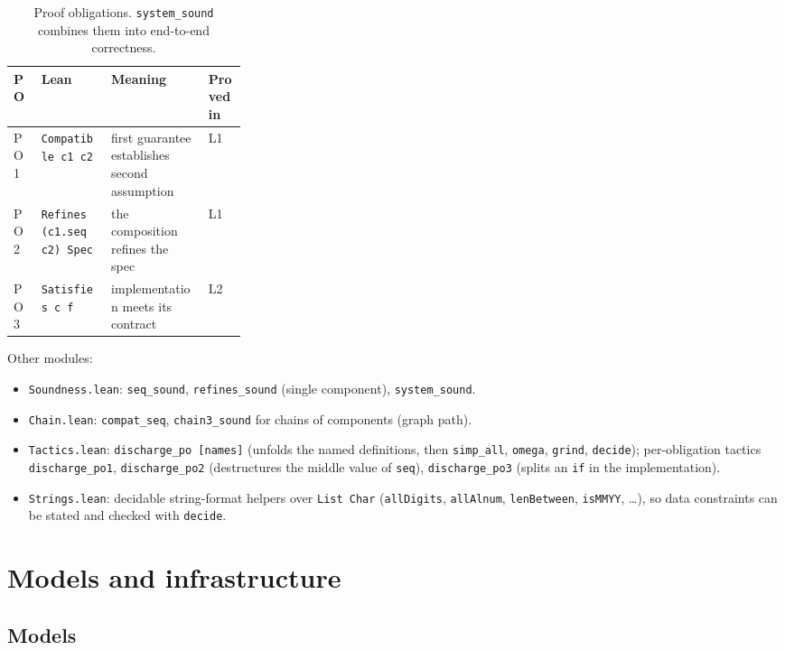 \documentclass[11pt,a4paper]{article}
\newcommand{\code}[1]{\texttt{#1}}
\newcommand{\file}[1]{\texttt{#1}}
\begin{document}
\begin{table}[h]
\centering
\small
\begin{tabularx}{\linewidth}{l >{\raggedright\arraybackslash}p{0.3\linewidth} L l}
\toprule
PO & Lean & Meaning & Proved in \\
\midrule
PO1 & \code{Compatible c1 c2} & first guarantee establishes second assumption & L1 \\
PO2 & \code{Refines (c1.seq c2) Spec} & the composition refines the spec & L1 \\
PO3 & \code{Satisfies c f} & implementation meets its contract & L2 \\
\bottomrule
\end{tabularx}
\caption{Proof obligations. \code{system\_sound} combines them into end-to-end correctness.}
\end{table}

Other modules:
\begin{itemize}
  \item \file{Soundness.lean}: \code{seq\_sound}, \code{refines\_sound} (single component),
        \code{system\_sound}.
  \item \file{Chain.lean}: \code{compat\_seq}, \code{chain3\_sound} for chains of components (graph path).
  \item \file{Tactics.lean}: \code{discharge\_po [names]} (unfolds the named definitions, then
        \code{simp\_all}, \code{omega}, \code{grind}, \code{decide}); per-obligation tactics
        \code{discharge\_po1}, \code{discharge\_po2} (destructures the middle value of \code{seq}),
        \code{discharge\_po3} (splits an \code{if} in the implementation).
  \item \file{Strings.lean}: decidable string-format helpers over \code{List Char}
        (\code{allDigits}, \code{allAlnum}, \code{lenBetween}, \code{isMMYY}, \ldots), so data
        constraints can be stated and checked with \code{decide}.
\end{itemize}

\section{Models and infrastructure}

\subsection{Models}
\end{document}

